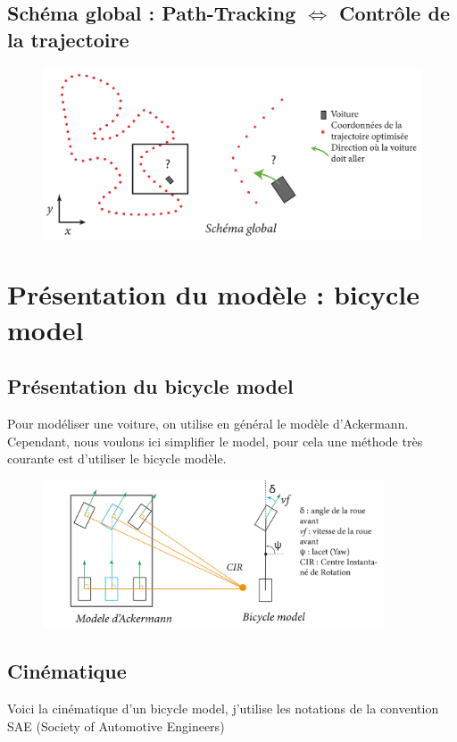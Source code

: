 \documentclass[a4paper,12pt]{extarticle}
\begin{document}
\subsection{Schéma global : Path-Tracking $\iff$ Contrôle de la trajectoire}

\begin{figure}[h]
    \centering
    \includegraphics[width=1\textwidth]{image/schema_global.png}\\
\end{figure}


\section{Présentation du modèle : bicycle model}
\subsection{Présentation du bicycle model}
Pour modéliser une voiture, on utilise en général le modèle d'Ackermann. Cependant, nous voulons ici simplifier le model, pour cela une méthode très courante est d'utiliser le bicycle modèle.


\begin{figure}[h!]
    \centering
    \includegraphics[width=0.9\textwidth]{image/Bicycle_model.png}\\
\end{figure}

\subsection{Cinématique}
Voici la cinématique d'un bicycle model, j'utilise les notations de la convention SAE (Society of Automotive Engineers)
\end{document}
